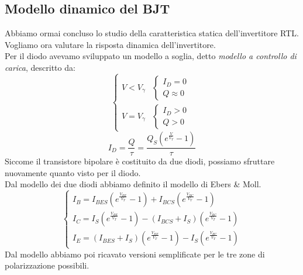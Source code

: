 \documentclass[../main.tex]{subfiles}
\begin{document}
	\subsection{Modello dinamico del BJT}
	Abbiamo ormai concluso lo studio della caratteristica statica dell'invertitore RTL.\\
	Vogliamo ora valutare la risposta dinamica dell'invertitore.\\
	Per il diodo avevamo sviluppato un modello a soglia, detto \textit{modello a controllo di carica}, descritto da:
	\[ \begin{cases} V < V_\gamma & \begin{cases} I_D = 0 \\ Q \approx 0 \end{cases} \\ V = V_\gamma & \begin{cases} I_D > 0 \\ Q > 0 \end{cases} \end{cases} \]
	\[ I_D = \frac{Q}{\tau} = \frac{Q_S \left( e^{\frac{V}{V_T}} - 1 \right)}{\tau} \]
	Siccome il transistore bipolare è costituito da due diodi, possiamo sfruttare nuovamente quanto visto per il diodo.\\
	Dal modello dei due diodi abbiamo definito il modello di Ebers \& Moll.
	\[ \begin{cases} I_B = I_{BES} \left( e^{\frac{V_{BE}}{V_T}} - 1 \right) + I_{BCS} \left( e^{\frac{V_{BC}}{V_T}} - 1 \right) \\ I_C = I_S \left( e^{\frac{V_{BE}}{V_T}} - 1 \right) - (I_{BCS} + I_S) \left( e^{\frac{V_{BC}}{V_T}} - 1 \right) \\ I_E = (I_{BES} + I_S) \left( e^{\frac{V_{BE}}{V_T}} - 1 \right) - I_S \left( e^{\frac{V_{BC}}{V_T}} - 1 \right) \end{cases} \]
	Dal modello abbiamo poi ricavato versioni semplificate per le tre zone di polarizzazione possibili.
\end{document}
